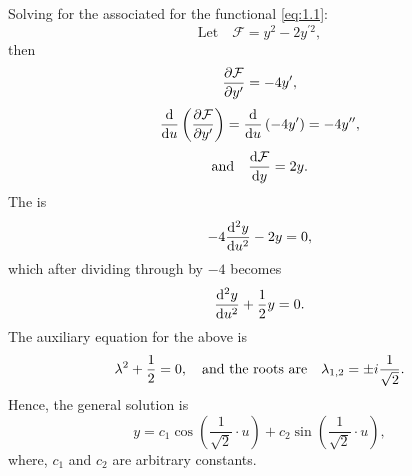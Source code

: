\def\F{\mathcal{F\xspace}}%
\def\L{\left(}%
\def\R{\right)}%
\def\osu{\L\frac{1}{\sqrt{2}}\cdot u\R}%
Solving for the associated \el for the functional \eqref{eq:1.1}:
\[
	\textrm{Let}\quad \F = y^2 - 2y^{\prime2},
\]
then
\[
	\pderiv{\F}{y^\prime} = -4 y^\prime,
\]
\[
	\deriv{}{u}\L\pderiv{\F}{y^\prime}\R = \deriv{}{u}\L-4 y^\prime\R = -4 y^\dprime,
\]
\[
	\textrm{and}\quad \deriv{\F}{y} = 2 y.
\]
The \el is
\[
	-4\frac{\mathrm{d}^2y}{\mathrm{d}u^2} - 2y = 0,
\]
which after dividing through by $-4$ becomes
\[
	\frac{\mathrm{d}^2y}{\mathrm{d}u^2} +\frac{1}{2} y = 0.
\]
The auxiliary equation for the above \el is
\[
	\lambda^2 + \frac{1}{2} = 0, \quad \textrm{and the roots are} \quad \lambda_{1,2} = \pm i\frac{1}{\sqrt{2}}.
\]
Hence, the general solution is
\begin{equation}
\label{eq:1.2}
	y = c_1\cos\osu + c_2\sin\osu,
\end{equation}
where, $c_1$ and $c_2$ are arbitrary constants.